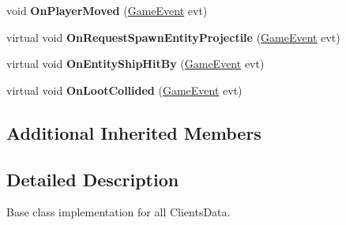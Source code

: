 \begin{DoxyCompactItemize}
\item 
\hypertarget{class_skyrates_1_1_client_1_1_network_1_1_client_acd9aff235088112fb7789ba5ada41ccf}{void {\bfseries On\-Player\-Moved} (\hyperlink{class_skyrates_1_1_client_1_1_game_1_1_event_1_1_game_event}{Game\-Event} evt)}\label{class_skyrates_1_1_client_1_1_network_1_1_client_acd9aff235088112fb7789ba5ada41ccf}

\item 
\hypertarget{class_skyrates_1_1_client_1_1_network_1_1_client_aac2883f56c14f9682a3ef5a3fdf1eb3d}{virtual void {\bfseries On\-Request\-Spawn\-Entity\-Projectile} (\hyperlink{class_skyrates_1_1_client_1_1_game_1_1_event_1_1_game_event}{Game\-Event} evt)}\label{class_skyrates_1_1_client_1_1_network_1_1_client_aac2883f56c14f9682a3ef5a3fdf1eb3d}

\item 
\hypertarget{class_skyrates_1_1_client_1_1_network_1_1_client_a32fc99e5fc2746985c5866217551c12e}{virtual void {\bfseries On\-Entity\-Ship\-Hit\-By} (\hyperlink{class_skyrates_1_1_client_1_1_game_1_1_event_1_1_game_event}{Game\-Event} evt)}\label{class_skyrates_1_1_client_1_1_network_1_1_client_a32fc99e5fc2746985c5866217551c12e}

\item 
\hypertarget{class_skyrates_1_1_client_1_1_network_1_1_client_a541b4866f79747430bede856c7f91d46}{virtual void {\bfseries On\-Loot\-Collided} (\hyperlink{class_skyrates_1_1_client_1_1_game_1_1_event_1_1_game_event}{Game\-Event} evt)}\label{class_skyrates_1_1_client_1_1_network_1_1_client_a541b4866f79747430bede856c7f91d46}

\end{DoxyCompactItemize}
\subsection*{Additional Inherited Members}


\subsection{Detailed Description}
Base class implementation for all Clients\-Data. 



